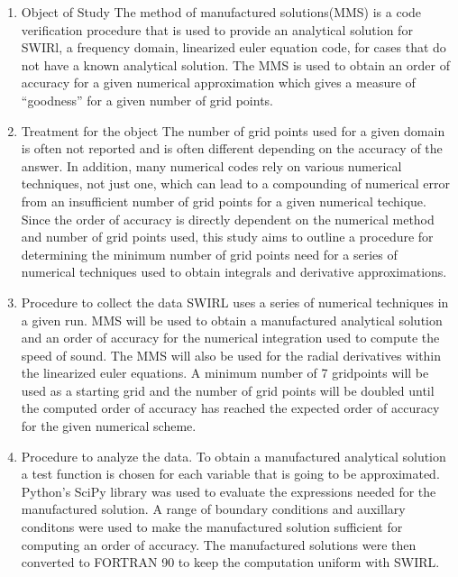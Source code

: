 \documentclass[a4paper]{article}
\begin{document}
\begin{enumerate}
    \item Object of Study
        \subitem The method of manufactured solutions(MMS) is a code verification 
        procedure that is used to provide an analytical solution for SWIRl, a
        frequency domain, linearized euler equation code, for cases 
        that do not have a known analytical solution. The MMS is used to 
        obtain an order of accuracy for a given numerical approximation which 
        gives a measure of ``goodness'' for a given number of grid points.  
    \item Treatment for the object
        \subitem The number of grid points used for a given domain is often not 
        reported and is often different depending on the accuracy of the answer. In
        addition, many numerical codes rely on various numerical techniques, not just one, which can
        lead to a compounding of numerical error from an insufficient number 
        of grid points for a given numerical techique. Since the order of 
        accuracy is directly dependent on the numerical method 
        and number of grid points used, this study aims to outline a procedure
        for determining the minimum number of grid points need for a series of numerical techniques used 
        to obtain integrals and derivative approximations. 
    \item Procedure to collect the data 
        \subitem SWIRL uses a series of numerical techniques in a given run. MMS will
        be used to obtain a manufactured analytical solution and an order of accuracy for 
        the numerical integration used to compute the speed of sound. The MMS will 
        also be used for the radial derivatives within the linearized euler equations. A minimum
        number of 7 gridpoints will be used as a starting grid and the number
        of grid points will be doubled until the computed order of accuracy has reached 
        the expected order of accuracy for the given numerical scheme.  
    \item Procedure to analyze the data.
    \subitem To obtain a manufactured analytical solution a test function is chosen
        for each variable that is going to be approximated. Python's SciPy library
        was used to evaluate the expressions needed for the manufactured solution.
        A range of boundary conditions and auxillary conditons were used to make 
        the manufactured solution sufficient for computing an order of accuracy.
        The manufactured solutions were then converted to FORTRAN 90 to keep the 
        computation uniform with SWIRL.  
\end{enumerate}
\end{document}
